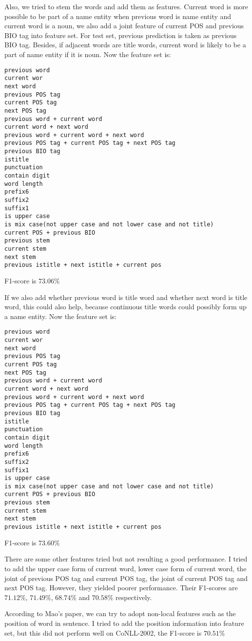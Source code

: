 \documentclass[10pt,twocolumn,letterpaper]{article}
\begin{document}
\par Also, we tried to stem the words and add them as features. Current word is more possible to be part of a name entity when previous word is name entity and current word is a noun, we also add a joint feature of current POS and previous BIO tag into feature set. For test set, previous prediction is taken as previous BIO tag. Besides, if adjacent words are title words, current word is likely to be a part of name entity if it is noun. Now the feature set is:
\begin{lstlisting}
previous word
current wor
next word
previous POS tag
current POS tag
next POS tag
previous word + current word
current word + next word
previous word + current word + next word
previous POS tag + current POS tag + next POS tag
previous BIO tag
istitle
punctuation
contain digit
word length
prefix6
suffix2
suffix1
is upper case
is mix case(not upper case and not lower case and not title)
current POS + previous BIO
previous stem
current stem
next stem
previous istitle + next istitle + current pos
\end{lstlisting}
F1-score is $73.06\%$

\par If we also add whether previous word is title word and whether next word is title word, this could also help, because continuous title words could possibly form up a name entity. Now the feature set is:
\begin{lstlisting}
previous word
current wor
next word
previous POS tag
current POS tag
next POS tag
previous word + current word
current word + next word
previous word + current word + next word
previous POS tag + current POS tag + next POS tag
previous BIO tag
istitle
punctuation
contain digit
word length
prefix6
suffix2
suffix1
is upper case
is mix case(not upper case and not lower case and not title)
current POS + previous BIO
previous stem
current stem
next stem
previous istitle + next istitle + current pos
\end{lstlisting}
F1-score is $73.60\%$

\par There are some other features tried but not resulting a good performance. I tried to add the upper case form of current word, lower case form of current word, the joint of previous POS tag and current POS tag, the joint of current POS tag and next POS tag. However, they yielded poorer performance. Their F1-scores are $71.12\%$, $71.49\%$, $68.74\%$ and $70.58\%$ respectively.

\par According to Mao's paper\cite{Global}, we can try to adopt non-local features such as the position of word in sentence. I tried to add the position information into feature set, but this did not perform well on CoNLL-2002, the F1-score is $70.51\%$

{\small


}
\end{document}
